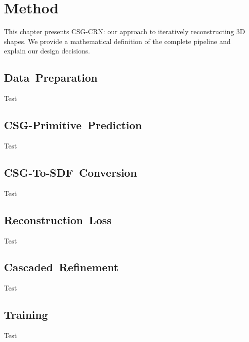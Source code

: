 
\chapter{Method}
\label{chap:method}

This chapter presents CSG-CRN: our approach to iteratively reconstructing 3D shapes. We provide a mathematical definition of the complete pipeline and explain our design decisions.


\section{Data~Preparation}
\label{sec:data_preparation}

Test


\section{CSG-Primitive~Prediction}
\label{sec:csg_primitive_prediction}

Test


\section{CSG-To-SDF~Conversion}
\label{sec:csg_to_sdf_conversion}

Test


\section{Reconstruction~Loss}
\label{sec:reconstruction_loss}

Test


\section{Cascaded~Refinement}
\label{sec:cascaded_refinement}

Test

\section{Training}
\label{sec:training}

Test